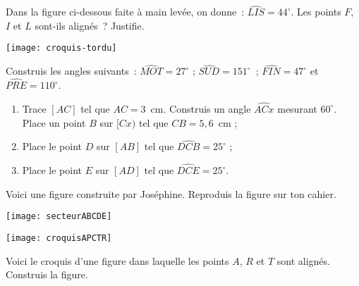\begin{exercice}[Alignés ?]
Dans la figure ci-dessous faite à main levée, on donne : $\widehat{LIS}= 44^\circ$.
Les points $F$, $I$ et $L$ sont-ils alignés ? Justifie.
 \begin{center} \texttt{[image: croquis-tordu]} \end{center}
\end{exercice} 




\begin{exercice}
Construis les angles suivants :
$\widehat{MOT} = 27^\circ$ ; $\widehat{SUD} = 151^\circ$ ; $\widehat{FIN} = 47^\circ$ et $\widehat{PRE} = 110^\circ$.
\end{exercice} 


\begin{exercice}
\begin{enumerate}
\item Trace $[AC]$ tel que $AC = 3$ cm. Construis un angle $\widehat{ACx}$ mesurant $60^\circ$. Place un point $B$ sur $[Cx)$ tel que $CB = 5,6$ cm ;
\item Place le point $D$ sur $[AB]$ tel que $\widehat{DCB} = 25^\circ$ ;
\item Place le point $E$ sur $[AD]$ tel que $\widehat{DCE} = 25^\circ$.
\end{enumerate}
\end{exercice} 


\begin{exercice}
Voici une figure construite par Joséphine. Reproduis la figure sur ton cahier.
 \begin{center} \texttt{[image: secteurABCDE]} \end{center}
\end{exercice} 


\begin{exercice}
 \begin{center} \texttt{[image: croquisAPCTR]} \end{center}
 Voici le croquis d’une figure dans laquelle les points $A$, $R$ et $T$ sont alignés. Construis la figure.
\end{exercice} 




